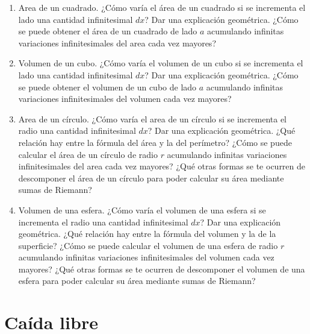 \documentclass[
  a4paper,
]{scrreport}
\begin{document}
\begin{enumerate}
\def\labelenumi{\arabic{enumi}.}
\item
  Area de un cuadrado. ¿Cómo varía el área de un cuadrado si se
  incrementa el lado una cantidad infinitesimal \(dx\)? Dar una
  explicación geométrica. ¿Cómo se puede obtener el área de un cuadrado
  de lado \(a\) acumulando infinitas variaciones infinitesimales del
  area cada vez mayores?
\item
  Volumen de un cubo. ¿Cómo varía el volumen de un cubo si se incrementa
  el lado una cantidad infinitesimal \(dx\)? Dar una explicación
  geométrica. ¿Cómo se puede obtener el volumen de un cubo de lado \(a\)
  acumulando infinitas variaciones infinitesimales del volumen cada vez
  mayores?
\item
  Area de un círculo. ¿Cómo varía el area de un círculo si se incrementa
  el radio una cantidad infinitesimal \(dx\)? Dar una explicación
  geométrica. ¿Qué relación hay entre la fórmula del área y la del
  perímetro? ¿Cómo se puede calcular el área de un círculo de radio
  \(r\) acumulando infinitas variaciones infinitesimales del area cada
  vez mayores? ¿Qué otras formas se te ocurren de descomponer el área de
  un círculo para poder calcular su área mediante sumas de Riemann?
\item
  Volumen de una esfera. ¿Cómo varía el volumen de una esfera si se
  incrementa el radio una cantidad infinitesimal \(dx\)? Dar una
  explicación geométrica. ¿Qué relación hay entre la fórmula del volumen
  y la de la superficie? ¿Cómo se puede calcular el volumen de una
  esfera de radio \(r\) acumulando infinitas variaciones infinitesimales
  del volumen cada vez mayores? ¿Qué otras formas se te ocurren de
  descomponer el volumen de una esfera para poder calcular su área
  mediante sumas de Riemann?
\end{enumerate}


\hypertarget{cauxedda-libre}{%
\chapter{Caída libre}\label{cauxedda-libre}}
\end{document}

